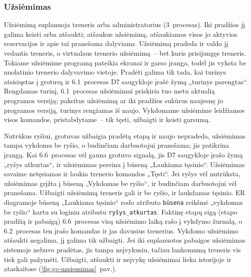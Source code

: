 \subsubsection{Užsiėmimas}\label{sec:gc-uzsiemimas}

Užsiėmimą suplanuoja treneris arba administratorius (3~procesas). Iki
pradžios jį galima keisti arba atšaukti; atšaukus užsiėmimą, atšaukiamos visos
jo aktyvios rezervacijos ir apie tai pranešama dalyviams. Užsiėmimą pradeda ir
valdo jį vedantis treneris, o virtualaus trenerio užsiėmimą~– bet kuris
prisijungęs treneris. Tokiame užsiėmime programą pateikia ekranai ir garso
įranga, todėl jis vyksta be nuolatinio trenerio dalyvavimo vietoje. Pradėti
galima tik tada, kai turinys atsisiųstas į grotuvą ir 6.1~procesas D7
saugykloje įrašė žymą „turinys parengtas“. Rengdamas turinį, 6.1~procesas
užsiėmimui priskiria tuo metu aktualią programos versiją; pakeitus užsiėmimą
ar iki pradžios sukūrus naujesnę jo programos versiją, turinys rengiamas iš
naujo. Vykdomame užsiėmime
leidžiamos visos komandos, pristabdytame~– tik tęsti, užbaigti ir keisti
garsumą.

Nutrūkus ryšiui, grotuvas užbaigia pradėtą etapą ir naujo nepradeda,
užsiėmimas tampa vykdomu be ryšio, o budinčiam darbuotojui pranešama; jis
patikrina įrangą. Kai 6.6~procesas vėl gauna grotuvo signalą, jis D7
saugykloje įrašo žymą „ryšys atkurtas“, ir užsiėmimas pereina į būseną
„Laukiama tęsinio“. Užsiėmimas savaime netęsiamas ir laukia trenerio komandos
„Tęsti“. Jei ryšys vėl nutrūksta, užsiėmimas grįžta į būseną „Vykdomas be
ryšio“, ir budinčiam darbuotojui vėl pranešama. Užbaigti užsiėmimą treneris gali
ir be ryšio, ir laukdamas tęsinio. ER diagramoje būseną „Laukiama tęsinio“ rodo
atributo \texttt{būsena} reikšmė „vykdomas be ryšio“ kartu su loginiu atributu
\texttt{ryšys\_atkurtas}.
Faktinę etapų eigą (etapo pradžią ir pabaigą) 6.6~procesas visą užsiėmimo
laiką rašo į vykdymo žurnalą, o 6.2~procesas ten įrašo komandas ir jas
davusius trenerius.
Vykdomo užsiėmimo atšaukti negalima, jį galima tik užbaigti. Jei iki
suplanuotos pabaigos užsiėmimas sistemoje nebuvo pradėtas, jis tampa
neįvykusiu, tačiau lankomumą treneris vis tiek gali pažymėti. Užbaigti,
atšaukti ir neįvykę užsiėmimai lieka istorijoje ir ataskaitose
(\ref{fig:gc-uzsiemimas}~pav.).

